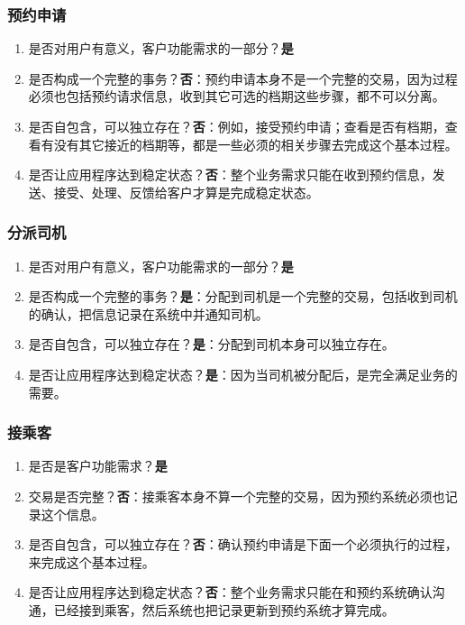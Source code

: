 \hypertarget{ux9884ux7ea6ux7533ux8bf7}{%
\subsubsection{预约申请}\label{ux9884ux7ea6ux7533ux8bf7}}

\begin{enumerate}
\tightlist
\item
  是否对用户有意义，客户功能需求的一部分？\textbf{是}
\item
  是否构成一个完整的事务？\textbf{否}：预约申请本身不是一个完整的交易，因为过程必须也包括预约请求信息，收到其它可选的档期这些步骤，都不可以分离。
\item
  是否自包含，可以独立存在？\textbf{否}：例如，接受预约申请；查看是否有档期，查看有没有其它接近的档期等，都是一些必须的相关步骤去完成这个基本过程。
\item
  是否让应用程序达到稳定状态？\textbf{否}：整个业务需求只能在收到预约信息，发送、接受、处理、反馈给客户才算是完成稳定状态。
\end{enumerate}

\hypertarget{ux5206ux6d3eux53f8ux673a}{%
\subsubsection{分派司机}\label{ux5206ux6d3eux53f8ux673a}}

\begin{enumerate}
\tightlist
\item
  是否对用户有意义，客户功能需求的一部分？\textbf{是}
\item
  是否构成一个完整的事务？\textbf{是}：分配到司机是一个完整的交易，包括收到司机的确认，把信息记录在系统中并通知司机。
\item
  是否自包含，可以独立存在？\textbf{是}：分配到司机本身可以独立存在。
\item
  是否让应用程序达到稳定状态？\textbf{是}：因为当司机被分配后，是完全满足业务的需要。
\end{enumerate}

\hypertarget{ux63a5ux4e58ux5ba2}{%
\subsubsection{接乘客}\label{ux63a5ux4e58ux5ba2}}

\begin{enumerate}
\tightlist
\item
  是否是客户功能需求？\textbf{是}
\item
  交易是否完整？\textbf{否}：接乘客本身不算一个完整的交易，因为预约系统必须也记录这个信息。
\item
  是否自包含，可以独立存在？\textbf{否}：确认预约申请是下面一个必须执行的过程，来完成这个基本过程。
\item
  是否让应用程序达到稳定状态？\textbf{否}：整个业务需求只能在和预约系统确认沟通，已经接到乘客，然后系统也把记录更新到预约系统才算完成。
\end{enumerate}

